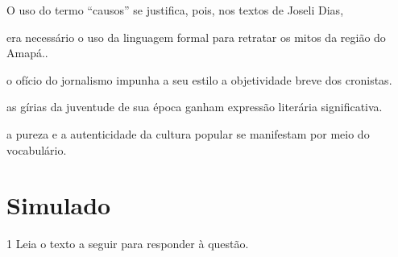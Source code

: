 O uso do termo ``causos'' se justifica, pois, nos textos de Joseli Dias,

\begin{escolha}
    
    \item era necessário o uso da linguagem formal para retratar os mitos da região do Amapá..
    
    \item o ofício do jornalismo impunha a seu estilo a objetividade breve dos cronistas.
    
    \item as gírias da juventude de sua época ganham expressão literária significativa.
    
    \item a pureza e a autenticidade da cultura popular se manifestam por meio do vocabulário.

\end{escolha}


\chapter[Simulado 4]{Simulado}

\num{1} Leia o texto a seguir para responder à questão. 

